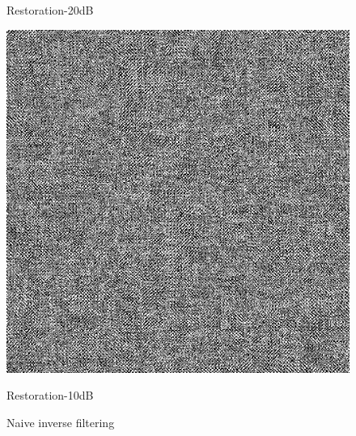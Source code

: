 \documentclass{article}
\begin{document}
\begin{figure}[H]
\begin{minipage}[b]{0.32\linewidth}
		\caption*{Restoration-20dB}
	\end{minipage}
	\begin{minipage}[b]{0.32\linewidth}
		\includegraphics[width=\linewidth,bb=0 0 20cm 20cm]{df1.bmp}
		\caption*{Restoration-10dB}
	\end{minipage}
	\caption{Naive inverse filtering}
	\label{direct}
\end{figure}
\end{document}
